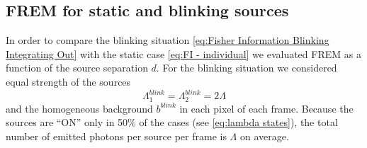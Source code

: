 

\subsection{FREM for static and blinking sources\label{sub:FREM static vs blinking}}
%
In order to compare the blinking situation \autoref{eq:Fisher Information Blinking Integrating Out} with the static case \autoref{eq:FI - individual} we evaluated FREM as a function of the source separation $d$. For the blinking situation we considered equal strength of the sources
%
\begin{equation}
	\Lambda_1^{blink}=\Lambda_2^{blink}=2\Lambda
\end{equation}
%
and the homogeneous background $b^{blink}$ in each pixel of each frame. Because the sources are ``ON'' only in 50\% of the cases (see \autoref{eq:lambda states}), the total number of emitted photons per source per frame is $\Lambda$ on average. 

